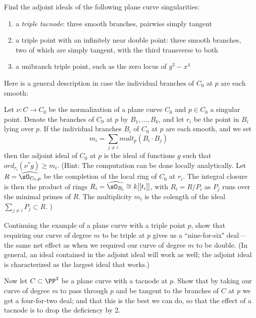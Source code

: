\begin{exercise}
Find the adjoint ideals of the following plane curve singularities:
\begin{enumerate}
\item a \emph{triple tacnode}: three smooth branches, pairwise simply tangent
\item a triple point with an infinitely near double point: three smooth branches, two of which are simply tangent, with the third transverse to both
\item a unibranch triple point, such as the zero locus of $y^3-x^4$
\end{enumerate}
\end{exercise}

Here is a  general description in case the individual branches of $C_0$ at $p$ are each smooth:

\begin{exercise}
Let $\nu : C \to C_0$ be the normalization of a plane curve $C_0$ and $p \in C_0$ a singular point. Denote the branches of $C_0$ at $p$ by $B_1,\dots,B_k$, and let $r_i$ be the point in $B_i$ lying over $p$. If the individual branches $B_i$ of $C_0$ at $p$ are each smooth, and we set
$$
m_i = \sum_{j \neq i} mult_p(B_i \cdot B_j)
$$
then the adjoint ideal of $C_0$ at $p$ is the ideal of functions $g$ such that $ord_{r_i}(\nu^*g) \geq m_i$.
(Hint: The computation can be done locally analytically. Let $R = \widehat{\sO_{C_0, p}}$ be the completion of the local ring
of $C_0$ at $r_i$. The integral closure is then the product of rings $R_i = \widehat{\sO_{B_i}} \cong k[[t_i]]$,
with $R_i = R/P_i$ as $P_j$ runs over the minimal primes of $R$. The multiplicity
$m_i$ is the colength of the ideal $\sum_{j\neq i}P_j \subset R$.
)
\end{exercise}

\begin{exercise}
Continuing the example of a plane curve with a triple point $p$, show that requiring our curve of degree $m$ to be triple at $p$ gives us a ``nine-for-six" deal---the same net effect as when we required our curve of degree $m$ to be double. (In general, an ideal contained in the adjoint ideal will work as well; the adjoint ideal is characterized as the largest ideal that works.)
\end{exercise}

\begin{exercise}
Now let $C \subset \PP^2$ be a plane curve with a tacnode at $p$. Show that by taking our curve of degree $m$ to pass through $p$ and be tangent to the branches of $C$ at $p$ we get a four-for-two deal; and that this is the best we can do, so that the effect of a tacnode is to drop the deficiency by 2.
\end{exercise}



